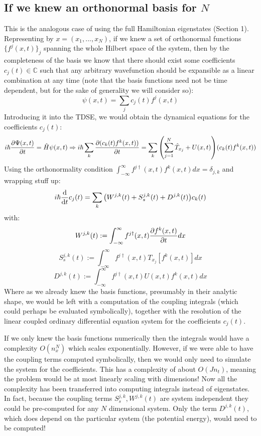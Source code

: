\documentclass[11pt, a4paper]{article} %
\newcommand{\C}{\mathbb{C}}
\begin{document}
\subsection{If we knew an orthonormal basis for $N$}
This is the analogous case of using the full Hamiltonian eigenstates (Section 1). Representing by $x=(x_1,...,x_N)$, if we knew a set of orthonormal functions $\{f^j(x,t)\}_j$ spanning the whole Hilbert space of the system, then by the completeness of the basis we know that there should exist some coefficients $c_j(t)\in \C$ such that any arbitrary wavefunction should be expansible as a linear combination at any time (note that the basis functions need not be time dependent, but for the sake of generality we will consider so):
\begin{equation}
\psi(x,t)=\sum_j c_j(t) f^j(x,t)
\end{equation}
Introducing it into the TDSE, we would obtain the dynamical equations for the coefficients $c_j(t)$:
\begin{equation}
i\hbar \pdv{\Psi(x,t)}{t}=\hat{H}\psi(x,t)\Rightarrow i\hbar \sum_k\pdv{(c_k(t)f^k(x,t))}{t}=\sum_k\qty(\sum_{j=1}^N \hat{T}_{x_j} + U(x, t))(c_k(t)f^k(x,t))
\end{equation}
Using the orthonormality condition $\int_{-\infty}^{\infty}f^{j\dagger}(x,t)f^k(x,t)dx=\delta_{j,k}$ and wrapping stuff up:
\begin{equation}
i\hbar\dv{}{t}c_j(t)=\sum_k\qty(W^{j,k}(t)+S^{j,k}_s(t)+D^{j,k}(t))c_k(t)
\end{equation}
with:
\begin{equation}
W^{j,k}(t):=\int_{-\infty}^{\infty}f^{j\dagger}(x,t) \pdv{f^k(x,t)}{t} dx
\end{equation}
\begin{equation}
S^{j,k}_s(t):=\int_{-\infty}^{\infty}f^{j\dagger}(x,t) T_{x_j}[f^k(x,t)] dx
\end{equation}
\begin{equation}
D^{j,k}(t):=\int_{-\infty}^{\infty}f^{j\dagger}(x,t) U(x,t)f^k(x,t) dx
\end{equation}
Where as we already knew the basis functions, presumably in their analytic shape, we would be left with a computation of the coupling integrals (which could perhaps be evaluated symbolically), together with the resolution of the linear coupled ordinary differential equation system for the coefficients $c_j(t)$.

If we only knew the basis functions numerically then the integrals would have a complexity $O(n_x^N)$ which scales exponentially. However, if we were able to have the coupling terms computed symbolically, then we would only need to simulate the system for the coefficients. This has a complexity of about $O(Jn_t)$, meaning the problem would be at most linearly scaling with dimensions! Now all the complexity has been transferred into computing integrals instead of eigenstates. In fact, because the coupling terms $S^{j,k}_s, W^{j,k}(t)$ are system independent they could be pre-computed for any $N$ dimensional system. Only the term $D^{j,k}(t)$, which does depend on the particular system (the potential energy), would need to be computed!
\end{document}

